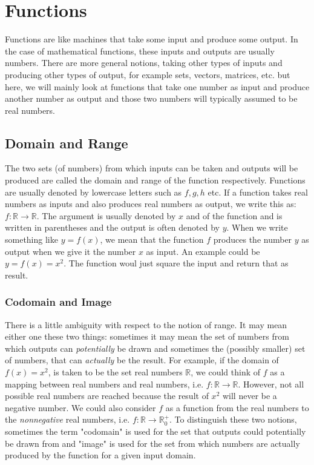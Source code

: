 \section{Functions}
Functions are like machines that take some input and produce some output. In the case of mathematical functions, these inputs and outputs are usually numbers. There are more general notions, taking other types of inputs and producing other types of output, for example sets, vectors, matrices, etc. but here, we will mainly look at functions that take one number as input and produce another number as output and those two numbers will typically assumed to be real numbers.

\subsection{Domain and Range}
The two sets (of numbers) from which inputs can be taken and outputs will be produced are called the domain and range of the function respectively. Functions are usually denoted by lowercase letters such as $f,g,h$ etc. If a function takes real numbers as inputs and also produces real numbers as output, we write this as: $f: \mathbb{R} \rightarrow \mathbb{R}$. The argument is usually denoted by $x$ and of the function and is written in parentheses and the output is often denoted by $y$. When we write something like $y = f(x)$, we mean that the function $f$ produces the number $y$ as output when we give it the number $x$ as input. An example could be $y = f(x) = x^2$. The function woul just square the input and return that as result. 

\medskip
\subsubsection{Codomain and Image}
There is a little ambiguity with respect to the notion of range. It may mean either one these two things: sometimes it may mean the set of numbers from which outputs can \emph{potentially} be drawn and sometimes the (possibly smaller) set of numbers, that can \emph{actually} be the result. For example, if the domain of $f(x) = x^2$, is taken to be the set real numbers $\mathbb{R}$, we could think of $f$ as a mapping between real numbers and real numbers, i.e. $f: \mathbb{R} \rightarrow \mathbb{R}$. However, not all possible real numbers are reached because the result of $x^2$ will never be a negative number. We could also consider $f$ as a function from the real numbers to the \emph{nonnegative} real numbers, i.e. $f: \mathbb{R} \rightarrow \mathbb{R}^+_0$. To distinguish these two notions, sometimes the term "codomain" is used for the set that outputs could potentially be drawn from and "image" is used for the set from which numbers are actually produced by the function for a given input domain.


